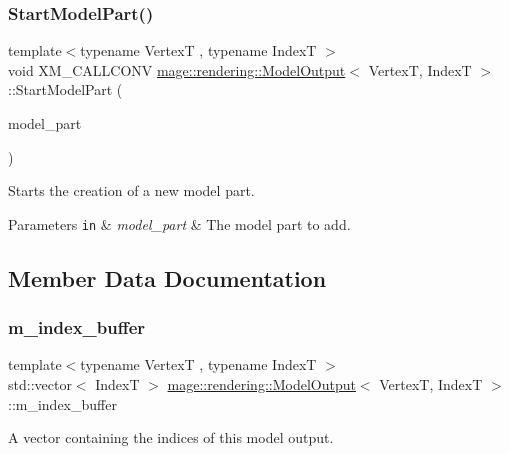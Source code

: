 \subsubsection{\texorpdfstring{Start\+Model\+Part()}{StartModelPart()}}
{\footnotesize\ttfamily template$<$typename VertexT , typename IndexT $>$ \\
void X\+M\+\_\+\+C\+A\+L\+L\+C\+O\+NV \hyperlink{structmage_1_1rendering_1_1_model_output}{mage\+::rendering\+::\+Model\+Output}$<$ VertexT, IndexT $>$\+::Start\+Model\+Part (\begin{DoxyParamCaption}\item[{\hyperlink{structmage_1_1rendering_1_1_model_part}{Model\+Part}}]{model\+\_\+part }\end{DoxyParamCaption})}

Starts the creation of a new model part.


\begin{DoxyParams}[1]{Parameters}
\mbox{\tt in}  & {\em model\+\_\+part} & The model part to add. \\
\hline
\end{DoxyParams}


\subsection{Member Data Documentation}
\hypertarget{structmage_1_1rendering_1_1_model_output_a0290ea3f7afa5022cedbc9bc316d24e0}{}\label{structmage_1_1rendering_1_1_model_output_a0290ea3f7afa5022cedbc9bc316d24e0} 
\subsubsection{\texorpdfstring{m\+\_\+index\+\_\+buffer}{m\_index\_buffer}}
{\footnotesize\ttfamily template$<$typename VertexT , typename IndexT $>$ \\
std\+::vector$<$ IndexT $>$ \hyperlink{structmage_1_1rendering_1_1_model_output}{mage\+::rendering\+::\+Model\+Output}$<$ VertexT, IndexT $>$\+::m\+\_\+index\+\_\+buffer}

A vector containing the indices of this model output. \hypertarget{structmage_1_1rendering_1_1_model_output_a7d290dd28d6cef9f33eead6cf30f042f}{}\label{structmage_1_1rendering_1_1_model_output_a7d290dd28d6cef9f33eead6cf30f042f} 
